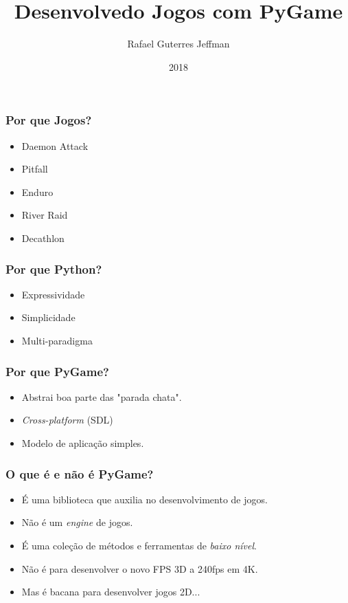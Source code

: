 


\title{Desenvolvedo Jogos com PyGame}
\subtitle{}
\author{Rafael Guterres Jeffman}
\date{2018}



\coverframe


\begin{frame}
    \frametitle{Por que Jogos?}

    \begin{itemize}
        \item Daemon Attack
        \item Pitfall
        \item Enduro
        \item River Raid
        \item Decathlon
    \end{itemize}
\end{frame}

\begin{frame}
    \frametitle{Por que Python?}

    \begin{itemize}
        \item Expressividade
        \item Simplicidade
        \item Multi-paradigma
    \end{itemize}
\end{frame}

\begin{frame}
    \frametitle{Por que PyGame?}

    \begin{itemize}
        \item Abstrai boa parte das "parada chata".
        \item \textit{Cross-platform} (SDL)
        \item Modelo de aplicação simples.
    \end{itemize}
\end{frame}

\begin{frame}
    \frametitle{O que é e não é PyGame?}

    \begin{itemize}
        \item É uma biblioteca que auxilia no desenvolvimento de jogos.
        \item Não é um \textit{engine} de jogos.
        \item É uma coleção de métodos e ferramentas de \textit{baixo nível}.
        \item Não é para desenvolver o novo FPS 3D a 240fps em 4K.
        \item Mas é bacana para desenvolver jogos 2D...
    \end{itemize}
\end{frame}

